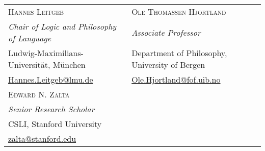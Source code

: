 \begin{small}
\begin{tabular}{l l}
  \textsc{Hannes Leitgeb}                                    & \textsc{Ole Thomassen Hjortland}\\
  \emph{Chair of Logic and Philosophy of Language}           & \emph{Associate Professor}\\
  Ludwig-Maximilians-Universit\"at, M\"unchen                & Department of Philosophy, University of Bergen\\
  \href{mailto:Hannes.Leitgeb@lmu.de}{Hannes.Leitgeb@lmu.de} & \href{mailto:Ole.Hjortland@fof.uib.no}{Ole.Hjortland@fof.uib.no}\\[2ex]

  \textsc{Edward N. Zalta}                                   & \\
  \emph{Senior Research Scholar}                             & \\
  CSLI, Stanford University                                  & \\
  \href{mailto:zalta@stanford.edu}{zalta@stanford.edu}
\end{tabular}
\end{small}

